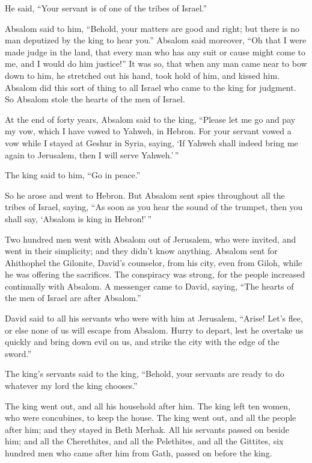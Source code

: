 He said, ``Your servant is of one of the tribes of Israel.''

 Absalom said to him, ``Behold, your matters are good and
right; but there is no man deputized by the king to hear you.''
 Absalom said moreover, ``Oh that I were made judge in the
land, that every man who has any suit or cause might come to me, and I
would do him justice!''  It was so, that when any man came
near to bow down to him, he stretched out his hand, took hold of him,
and kissed him.  Absalom did this sort of thing to all
Israel who came to the king for judgment. So Absalom stole the hearts of
the men of Israel.

 At the end of forty years, Absalom said to the king,
``Please let me go and pay my vow, which I have vowed to Yahweh, in
Hebron.  For your servant vowed a vow while I stayed at
Geshur in Syria, saying, `If Yahweh shall indeed bring me again to
Jerusalem, then I will serve Yahweh.'\,''

 The king said to him, ``Go in peace.''

So he arose and went to Hebron.  But Absalom sent spies
throughout all the tribes of Israel, saying, ``As soon as you hear the
sound of the trumpet, then you shall say, `Absalom is king in
Hebron!'\,''

 Two hundred men went with Absalom out of Jerusalem, who
were invited, and went in their simplicity; and they didn't know
anything.  Absalom sent for Ahithophel the Gilonite,
David's counselor, from his city, even from Giloh, while he was offering
the sacrifices. The conspiracy was strong, for the people increased
continually with Absalom.  A messenger came to David,
saying, ``The hearts of the men of Israel are after Absalom.''

 David said to all his servants who were with him at
Jerusalem, ``Arise! Let's flee, or else none of us will escape from
Absalom. Hurry to depart, lest he overtake us quickly and bring down
evil on us, and strike the city with the edge of the sword.''

 The king's servants said to the king, ``Behold, your
servants are ready to do whatever my lord the king chooses.''

 The king went out, and all his household after him. The
king left ten women, who were concubines, to keep the house.
 The king went out, and all the people after him; and
they stayed in Beth Merhak.  All his servants passed on
beside him; and all the Cherethites, and all the Pelethites, and all the
Gittites, six hundred men who came after him from Gath, passed on before
the king.

